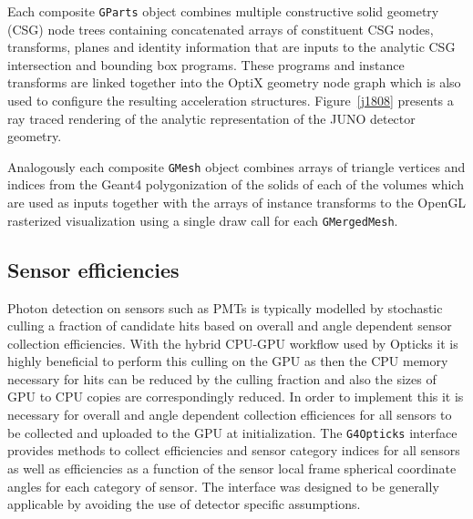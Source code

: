 \documentclass{webofc}
\begin{document}
Each composite {\tt GParts} object combines multiple constructive solid geometry (CSG) node trees
containing concatenated arrays of constituent CSG nodes, transforms, planes and identity information
that are inputs to the analytic CSG intersection and bounding box programs. These programs 
and instance transforms are linked together into the OptiX geometry node graph which is also 
used to configure the resulting acceleration structures. 
Figure~\ref{j1808} presents a ray traced rendering of the analytic representation of the JUNO detector geometry. 

Analogously each composite {\tt GMesh} object combines arrays of triangle vertices and indices from 
the Geant4 polygonization of the solids of each of the volumes which are used as inputs together with 
the arrays of instance transforms to the OpenGL rasterized visualization using a single draw call for each {\tt GMergedMesh}.
%
\subsection{Sensor efficiencies}%
%
Photon detection on sensors such as PMTs is typically modelled by stochastic culling a fraction of 
candidate hits based on overall and angle dependent sensor collection efficiencies. 
With the hybrid CPU-GPU workflow used by Opticks it is highly beneficial to perform this culling 
on the GPU as then the CPU memory necessary for hits can be reduced by the culling fraction and also the sizes of 
GPU to CPU copies are correspondingly reduced. In order to implement this it is necessary for overall and 
angle dependent collection efficiences for all sensors to be collected and uploaded to the GPU at 
initialization. The {\tt G4Opticks} interface provides methods to collect efficiencies and sensor category indices 
for all sensors as well as efficiencies as a function of the sensor local frame spherical coordinate angles 
for each category of sensor. The interface was designed to be generally applicable by avoiding the use of 
detector specific assumptions. 
\end{document}
